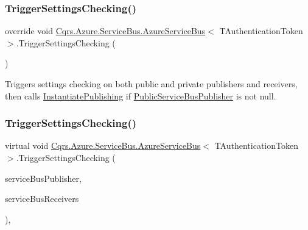 \subsubsection{\texorpdfstring{Trigger\+Settings\+Checking()}{TriggerSettingsChecking()}\hspace{0.1cm}{\footnotesize\ttfamily [1/2]}}
{\footnotesize\ttfamily override void \hyperlink{classCqrs_1_1Azure_1_1ServiceBus_1_1AzureServiceBus}{Cqrs.\+Azure.\+Service\+Bus.\+Azure\+Service\+Bus}$<$ T\+Authentication\+Token $>$.Trigger\+Settings\+Checking (\begin{DoxyParamCaption}{ }\end{DoxyParamCaption})\hspace{0.3cm}{\ttfamily [protected]}}



Triggers settings checking on both public and private publishers and receivers, then calls \hyperlink{classCqrs_1_1Azure_1_1ServiceBus_1_1AzureServiceBus_a5c286d29b0bbfe3770f3407efda57036_a5c286d29b0bbfe3770f3407efda57036}{Instantiate\+Publishing} if \hyperlink{classCqrs_1_1Azure_1_1ServiceBus_1_1AzureServiceBus_a17195f3c8e05ec37dfac37a8e9e1b089_a17195f3c8e05ec37dfac37a8e9e1b089}{Public\+Service\+Bus\+Publisher} is not null. 

\mbox{\label{classCqrs_1_1Azure_1_1ServiceBus_1_1AzureServiceBus_a26e66a663cabca99160b7f7c650bbfaa_a26e66a663cabca99160b7f7c650bbfaa}} 
\subsubsection{\texorpdfstring{Trigger\+Settings\+Checking()}{TriggerSettingsChecking()}\hspace{0.1cm}{\footnotesize\ttfamily [2/2]}}
{\footnotesize\ttfamily virtual void \hyperlink{classCqrs_1_1Azure_1_1ServiceBus_1_1AzureServiceBus}{Cqrs.\+Azure.\+Service\+Bus.\+Azure\+Service\+Bus}$<$ T\+Authentication\+Token $>$.Trigger\+Settings\+Checking (\begin{DoxyParamCaption}\item[{Topic\+Client}]{service\+Bus\+Publisher,  }\item[{I\+Dictionary$<$ int, I\+Message\+Receiver $>$}]{service\+Bus\+Receivers }\end{DoxyParamCaption})\hspace{0.3cm}{\ttfamily [protected]}, {\ttfamily [virtual]}}



